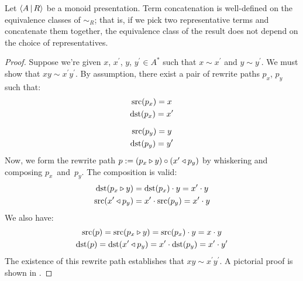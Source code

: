 \documentclass[../generics]{subfiles}
\begin{document}
\begin{theorem}
%
Let $\langle A\,|\,R\rangle$ be a monoid presentation. Term concatenation is well-defined on the equivalence classes of $\sim_R$; that is, if we pick two representative terms and concatenate them together, the equivalence class of the result does not depend on the choice of representatives.
\end{theorem}
\begin{proof}
Suppose we're given $x$, $x^\prime$, $y$, $y^\prime\in A^*$ such that $x\sim x^\prime$ and $y\sim y^\prime$. We must show that $xy\sim x^\prime y^\prime$. By assumption, there exist a pair of rewrite paths $p_x$, $p_y$ such that:
\begin{gather*}
\operatorname{src}(p_x)=x\\
\operatorname{dst}(p_x)=x^\prime\\[\medskipamount]
\operatorname{src}(p_y)=y\\
\operatorname{dst}(p_y)=y^\prime
\end{gather*}
Now, we form the rewrite path $p := (p_x\triangleright y) \circ (x^\prime\triangleleft p_y)$ by whiskering and composing $p_x$~and~$p_y$. The composition is valid:
\begin{gather*}
\operatorname{dst}(p_x\triangleright y)=\operatorname{dst}(p_x)\cdot y=x^\prime\cdot y\\
\operatorname{src}(x^\prime\triangleleft p_y)=x^\prime\cdot\operatorname{src}(p_y)=x^\prime\cdot y
\end{gather*}
We also have:
\begin{gather*}
\operatorname{src}(p) = \operatorname{src}(p_x\triangleright y) = \operatorname{src}(p_x)\cdot y = x\cdot y\\
\operatorname{dst}(p) = \operatorname{dst}(x^\prime\triangleleft p_y) = x^\prime \cdot \operatorname{dst}(p_y) = x^\prime\cdot y^\prime
\end{gather*}
The existence of this rewrite path establishes that $xy\sim x^\prime y^\prime$. A pictorial proof is shown in .
\end{proof}
\end{document}
